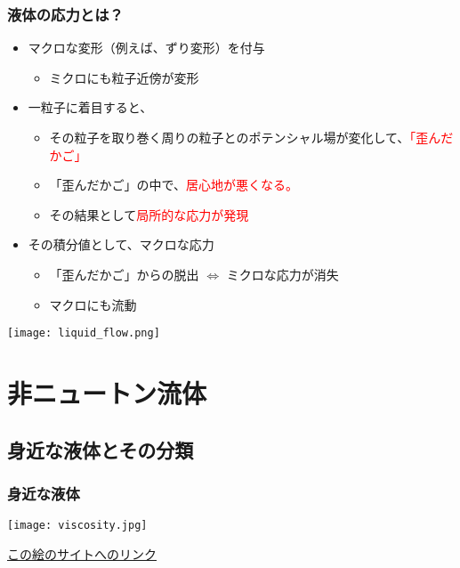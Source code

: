 \documentclass[12pt, dvipdfmx]{beamer}
\begin{document}
\begin{frame}
	\frametitle{液体の応力とは？}
		\begin{itemize}
			\item マクロな変形（例えば、ずり変形）を付与
			\begin{itemize}
				\item ミクロにも粒子近傍が変形
			\end{itemize}
			\item 一粒子に着目すると、
			\begin{itemize}
				\item その粒子を取り巻く周りの粒子とのポテンシャル場が変化して、\textcolor{red}{「歪んだかご」}
				\item 「歪んだかご」の中で、\textcolor{red}{居心地が悪くなる。}
				\item その結果として\textcolor{red}{局所的な応力が発現}
			\end{itemize}
			\item その積分値として、マクロな応力
			\begin{itemize}
				\item 「歪んだかご」からの\alert{脱出 $\Leftrightarrow$ ミクロな応力が消失 }
				\item マクロにも\alert{流動}
			\end{itemize}
		\end{itemize}
		\vspace{3mm}
		\begin{center}
			\texttt{[image: liquid\_flow.png]}
		\end{center}
\end{frame}

\section{非ニュートン流体}

\subsection{身近な液体とその分類}
\begin{frame}
	\frametitle{身近な液体}
		\begin{center}
			\texttt{[image: viscosity.jpg]}

        \href{https://www.iwakipumps.jp/blog/naruhodo/08/}{この絵のサイトへのリンク}
		\end{center}
\end{frame}
\end{document}
